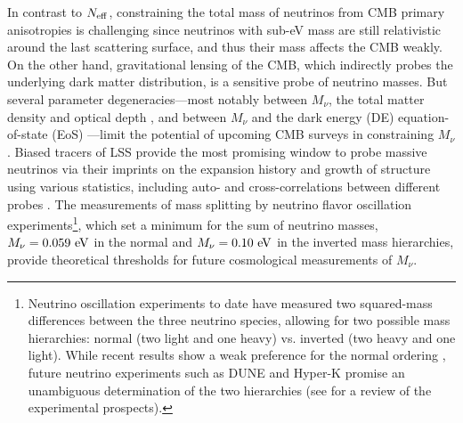 \documentclass[twocolumn]{aastex631}
\begin{document}
In contrast to $N_{\rm eff}$, constraining the total mass of neutrinos from CMB primary anisotropies is challenging since neutrinos with sub-eV mass are still relativistic around the last scattering surface, and thus their mass affects the CMB weakly. On the other hand, gravitational lensing of the CMB, which indirectly probes the underlying dark matter distribution, is a sensitive probe of neutrino masses. But several parameter degeneracies---most notably between $M_\nu$, the total matter density and optical depth \citep{Allison:2015qca,Liu:2015txa}, and between $M_\nu$ and the dark energy (DE) equation-of-state (EoS) \citep{Hannestad:2005gj,RoyChoudhury:2019hls}---limit the potential of upcoming CMB surveys \citep{SimonsObservatory:2018koc,Abazajian:2016yjj,Sugai:2020pjw} in constraining $M_\nu$. Biased tracers of LSS provide the most promising window to probe massive neutrinos via their imprints on the expansion history and growth of structure using various statistics, including auto- and cross-correlations between different probes \citep{Dvorkin:2019jgs,Boyle:2017lzt,Schmittfull:2017ffw,Yu:2018tem,Chudaykin:2019ock,Hahn:2019zob,Boyle:2020rxq,Massara:2020pli,Hahn:2020lou,Bayer:2021iyb,Chen:2021vba}. The measurements of mass splitting by neutrino flavor oscillation experiments\footnote{Neutrino oscillation experiments to date \citep{deSalas:2017kay,Esteban:2018azc} have measured two squared-mass differences between the three neutrino species, allowing for two possible mass hierarchies: normal (two light and one heavy) vs. inverted (two heavy and one light). While recent results show a weak preference for the normal ordering \citep{Super-Kamiokande:2017yvm,T2K:2018rhz,NOvA:2019cyt}, future neutrino experiments such as DUNE \citep{DUNE:2020jqi} and Hyper-K \citep{Hyper-Kamiokande:2018ofw} promise an unambiguous determination of the two hierarchies (see \citealt{Patterson:2015xja} for a review of the experimental prospects).}, which set a minimum for the sum of neutrino masses, $M_\nu = 0.059\ {\rm eV}$ in the normal and $M_\nu = 0.10 \ {\rm eV}$ in the inverted mass hierarchies, provide theoretical thresholds for future cosmological measurements of $M_\nu$.
\end{document}
